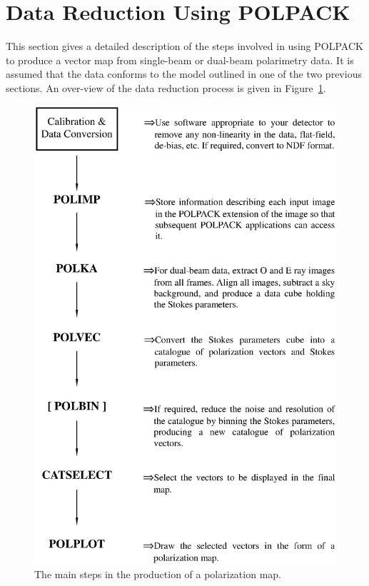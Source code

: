 \documentclass[twoside,11pt]{article}
\newenvironment{latexonly}{}{}
\newcommand{\latex}[1]{#1}
\newcommand{\html}[1]{}
\newcommand{\xlabel}[1]{}
\renewcommand{\_}{\texttt{\symbol{95}}}
\begin{document}
\section{\label{SEC:POLRED}\xlabel{datareductionusingpolpack}Data Reduction Using POLPACK}
This section gives a detailed description of the steps involved in using
POLPACK to produce a vector map from single-beam or dual-beam polarimetry
data. It is assumed that the data conforms to the model outlined in one
of the two previous sections. An over-view of the data reduction process
is given in \latex{Figure~\ref{fig:dataflow}.} \html{the next figure:}

\begin{latexonly}
  \begin{figure}[htpb]
  \begin{center}
  \includegraphics[clip,scale=0.7]{sun223_figures/dataflow.eps}
  \vspace{4mm}
  \caption{The main steps in the production of a polarization map.}
  \label{fig:dataflow}
  \end{center}
  \end{figure}
\end{latexonly}
\end{document}
